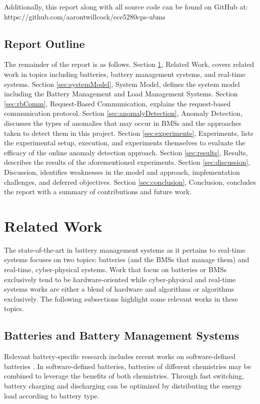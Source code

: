 \documentclass[11pt,conference,draftcls,onecolumn]{IEEEtran}
\begin{document}
Additionally, this report along with all source code can be found on GitHub at:
https://github.com/aarontwillcock/ece5280cps-ubms

\subsection{Report Outline}
The remainder of the report is as follows.
Section \ref{sec:relatedWork}, Related Work, covers related work in topics including batteries, battery management systems, and real-time systems.
Section \ref{sec:systemModel}, System Model, defines the system model including the Battery Management and Load Management Systems.
Section \ref{sec:rbComm}, Request-Based Communication, explains the request-based communication protocol.
Section \ref{sec:anomalyDetection}, Anomaly Detection, discusses the types of anomalies that may occur in BMSs and the approaches taken to detect them in this project.
Section \ref{sec:experiments}, Experiments, lists the experimental setup, execution, and experiments themselves to evaluate the efficacy of the online anomaly detection approach.
Section \ref{sec:results}, Results, describes the results of the aforementioned experiments.
Section \ref{sec:discussion}, Discussion, identifies weaknesses in the model and approach, implementation challenges, and deferred objectives.
Section \ref{sec:conclusion}, Conclusion, concludes the report with a summary of contributions and future work. 

\section{Related Work}\label{sec:relatedWork}
The state-of-the-art in battery management systems as it pertains to real-time systems focuses on two topics: batteries (and the BMSs that manage them) and real-time, cyber-physical systems.
Work that focus on batteries or BMSs exclusively tend to be hardware-oriented while cyber-physical and real-time systems works are either a blend of hardware and algorithms or algorithms exclusively.
The following subsections highlight some relevant works in these topics.

\subsection{Batteries and Battery Management Systems}
Relevant battery-specific research includes recent works on software-defined batteries \cite{softwareDefinedBatteriesConf,softwareDefinedBatteriesJrnl}.
In software-defined batteries, batteries of different chemistries may be combined to leverage the benefits of both chemistries.
Through fast switching, battery charging and discharging can be optimized by distributing the energy load according to battery type.
\end{document}
